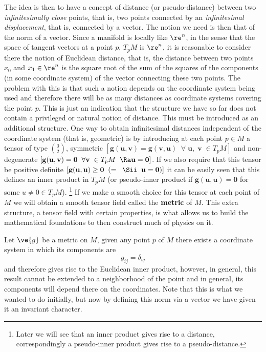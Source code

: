 The idea is then to have a concept of distance (or pseudo-distance)
between two {\sl infinitesimally close} points, that is, two
points connected by an {\sl infinitesimal displacement}, that is,
connected by a vector. The notion we need is then that of
the norm of a vector. Since a manifold is locally like $\re^n$, in
the sense that the space of tangent vectors at a point $p$,
$T_pM$ is $\re^n$, it is reasonable to consider there the notion of Euclidean distance,
that is, the distance between two points $x_0$ and $x_1\in \re^n$
is the square root of the sum of the squares of the
components (in some coordinate system) of the vector connecting
these two points. The problem with this is that
such a notion depends on the coordinate system being used and
therefore there will be as many distances as coordinate systems covering
the point $p$.
This is just an indication that the structure we have so far does not contain a privileged or
natural notion of distance. This must be introduced as an additional structure.
One way to obtain infinitesimal distances independent of the coordinate system (that is, geometric)
is by introducing at each point $p \in M$ a tensor of type ${0\choose 2}$, symmetric
$[\mathbf{g(u,v) = g(v,u) \;\; \forall \; u,\;v} \; \in T_pM]$ and non-degenerate 
$[\mathbf{g(u,v) = 0\;\; \forall v} \; \in T_pM \;\;\Ra \mathbf{u=0}]$.
If we also require that this tensor be
positive definite 
$[\mathbf{g(u,u) \geq 0 \;\; (=\;\;\Sii\;\; u=0)}] $
it can be easily seen that this
defines an inner product in $T_pM$ (or pseudo-inner product
if $\mathbf{g(u,u) =0}$ for some $u \neq 0 \in T_pM$).
\footnote{Later we will see that an inner product gives rise
to a distance, correspondingly a pseudo-inner product gives
rise to a pseudo-distance.} 
If we make a smooth choice for this tensor at each point of $M$ we will obtain a smooth tensor field called the
{\bf metric} of $M$. This extra structure, a tensor field with
certain properties, is what allows us to build the mathematical foundations
to then construct much of physics on it.

Let $\ve{g}$ be a metric on $M$, given any point $p$ of $M$
there exists a coordinate system in which its components are
$$g_{ij} = \delta_{ij} $$ 
and therefore gives rise to the Euclidean inner product, however, in general, this result cannot be extended to 
a neighborhood of the point and in general, its components will depend there on 
the coordinates. Note that this is what we wanted to do initially,
but now by defining this norm via a vector we have given it an invariant character.

